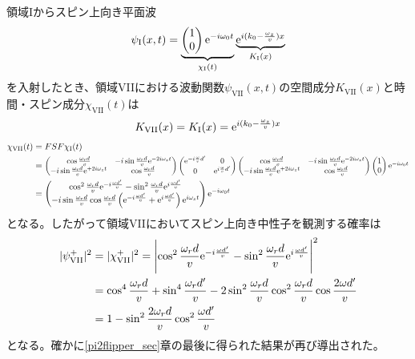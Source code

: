 領域Iからスピン上向き平面波
\begin{equation}
\psi_\mathrm{I}(x,t)=\underbrace{\begin{pmatrix} 1\\0\end{pmatrix} \mathrm{e}^{-i\omega_0t}}_{\chi_\mathrm{I}(t)} \underbrace{\mathrm{e}^{i (k_0-\frac{\omega_z}{v})x}}_{K_\mathrm{I}(x)}
\end{equation}
を入射したとき、領域VIIにおける波動関数$\psi_\mathrm{VII}(x,t)$の空間成分$K_\mathrm{VII}(x)$と時間・スピン成分$\chi_\mathrm{VII}(t)$は
\begin{align}
K_\mathrm{VII}(x)=K_\mathrm{I}(x)=\mathrm{e}^{i (k_0-\frac{\omega_z}{v})x}
\end{align}
\begin{align}
\chi_\mathrm{VII}(t)&=FSF\chi_\mathrm{I}(t) \notag \\
&=\scalebox{0.9}{$\begin{pmatrix} \cos \frac{\omega_r d}{v} &-i\sin\frac{\omega_rd}{v}\e^{-2i\omega_zt} \\ -i\sin\frac{\omega_rd}{v}\e^{+2i\omega_zt} &\cos \frac{\omega_r d}{v}\end{pmatrix}\begin{pmatrix} \e^{-i\frac{\omega}{v}d'} & 0\\0 &\e^{i\frac{\omega}{v}d'} \end{pmatrix}\begin{pmatrix} \cos \frac{\omega_r d}{v} &-i\sin\frac{\omega_rd}{v}\e^{-2i\omega_zt} \\ -i\sin\frac{\omega_rd}{v}\e^{+2i\omega_zt} &\cos \frac{\omega_r d}{v}\end{pmatrix} \begin{pmatrix} 1\\0\end{pmatrix} \e^{-i\omega_0t}$} \notag \\
&=\begin{pmatrix} \cos^2 \frac{\omega_r d}{v} \e^{-i\frac{\omega d'}{v}} -\sin^2 \frac{\omega_r d}{v} \e^{i\frac{\omega d'}{v}} \\ -i\sin\frac{\omega_r d}{v}\cos\frac{\omega_r d}{v}\left(\e^{-i\frac{\omega d'}{v}}+\e^{i\frac{\omega d'}{v}} \right) \e^{i\omega_s t} \end{pmatrix}\e^{-i\omega_0t}
\end{align}
となる。したがって領域VIIにおいてスピン上向き中性子を観測する確率は
\begin{align}
|\psi_\mathrm{VII}^+|^2&=|\chi_\mathrm{VII}^+|^2=\Biggl|\cos^2 \frac{\omega_r d}{v} \mathrm{e}^{-i\frac{\omega d'}{v}} -\sin^2 \frac{\omega_r d}{v} \mathrm{e}^{i\frac{\omega d'}{v}}\Biggr|^2\notag \\
&=\cos^4 \frac{\omega_r d}{v} +\sin^4 \frac{\omega_r d'}{v} -2\sin^2\frac{\omega_rd}{v}\cos^2\frac{\omega_rd}{v} \cos \frac{2\omega d'}{v} \notag \\
&=1-\sin^2 \frac{2\omega_r d}{v} \cos^2 \frac{\omega d'}{v}
\end{align}
となる。確かに\ref{pi2flipper_sec}章の最後に得られた結果が再び導出された。
\renewcommand{\arraystretch}{1}





